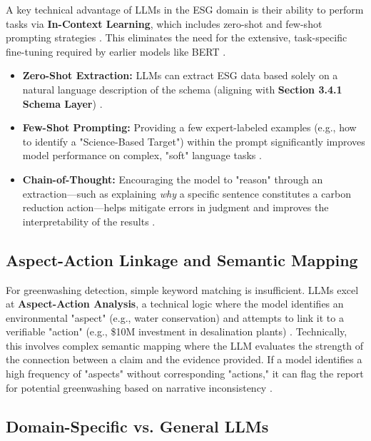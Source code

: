 \documentclass[english, online, cse, master]{dithesis}
\begin{document}
A key technical advantage of LLMs in the ESG domain is their ability to perform tasks via \textbf{In-Context Learning}, which includes zero-shot and few-shot prompting strategies  \parencite{frederik_maibaum_b8629037}. This eliminates the need for the extensive, task-specific fine-tuning required by earlier models like BERT  \parencite[]{tae_sun_chung_e16a4c18, frederik_maibaum_b8629037}.
\begin{itemize}
\item 

\textbf{Zero-Shot Extraction:} LLMs can extract ESG data based solely on a natural language description of the schema (aligning with \textbf{Section 3.4.1 Schema Layer})  \parencite{marco_bronzini_bf94d949}.\item 

\textbf{Few-Shot Prompting:} Providing a few expert-labeled examples (e.g., how to identify a "Science-Based Target") within the prompt significantly improves model performance on complex, "soft" language tasks  \parencite[]{frederik_maibaum_b8629037, arash_hajikhani_cbb2528f}.\item 

\textbf{Chain-of-Thought:} Encouraging the model to "reason" through an extraction—such as explaining \textit{why} a specific sentence constitutes a carbon reduction action—helps mitigate errors in judgment and improves the interpretability of the results  \parencite{arash_hajikhani_cbb2528f}.
\end{itemize}
\subsection{Aspect-Action Linkage and Semantic Mapping}

For greenwashing detection, simple keyword matching is insufficient. LLMs excel at \textbf{Aspect-Action Analysis}, a technical logic where the model identifies an environmental "aspect" (e.g., water conservation) and attempts to link it to a verifiable "action" (e.g., \$10M investment in desalination plants)  \parencite{keane_ong_369a0b63}. Technically, this involves complex semantic mapping where the LLM evaluates the strength of the connection between a claim and the evidence provided. If a model identifies a high frequency of "aspects" without corresponding "actions," it can flag the report for potential greenwashing based on narrative inconsistency  \parencite[]{xiaojia_wang_02351a60, keane_ong_369a0b63}.
\subsection{ Domain-Specific vs. General LLMs}
\end{document}

